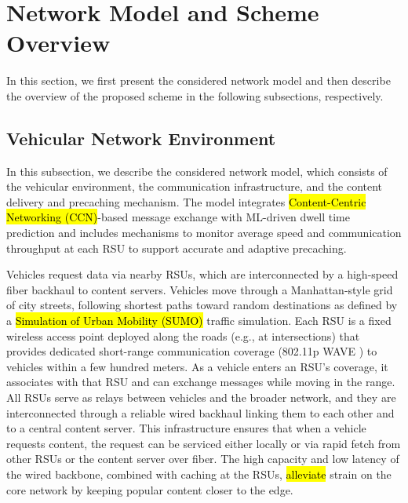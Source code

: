 \documentclass[journal]{IEEEtran}
\begin{document}
\section{Network Model and Scheme Overview} \label{sec.net}
In this section, we first present the considered network model and then describe the overview of the proposed scheme in the following subsections, respectively.

\subsection{Vehicular Network Environment}
In this subsection, we describe the considered network model, which consists of the vehicular environment, the communication infrastructure, and the content delivery and precaching mechanism.
The model integrates \hl{Content-Centric Networking (CCN)}-based message exchange with ML-driven dwell time prediction and includes mechanisms to monitor average speed and communication throughput at each RSU to support accurate and adaptive precaching.

Vehicles request data via nearby RSUs, which are interconnected by a high-speed fiber backhaul to content servers.
Vehicles move through a Manhattan-style grid of city streets, following shortest paths toward random destinations as defined by a \hl{Simulation of Urban Mobility (SUMO)} traffic simulation.
Each RSU is a fixed wireless access point deployed along the roads (e.g., at intersections) that provides dedicated short-range communication coverage (802.11p WAVE \cite{WAVE}) to vehicles within a few hundred meters.
As a vehicle enters an RSU's coverage, it associates with that RSU and can exchange messages while moving in the range.
All RSUs serve as relays between vehicles and the broader network, and they are interconnected through a reliable wired backhaul linking them to each other and to a central content server.
This infrastructure ensures that when a vehicle requests content, the request can be serviced either locally or via rapid fetch from other RSUs or the content server over fiber.
The high capacity and low latency of the wired backbone, combined with caching at the RSUs, \hl{alleviate} strain on the core network by keeping popular content closer to the edge.
\end{document}

